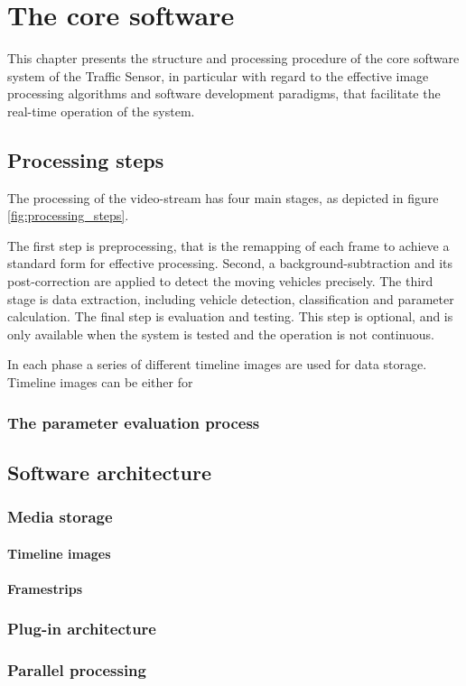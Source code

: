 \chapter{The core software}\label{chap:Core software}
This chapter presents the structure and processing procedure of the core software system of the Traffic Sensor, in particular with regard to the effective image processing algorithms and software development paradigms, that facilitate the real-time operation of the system.
\section{Processing steps}
The processing of the video-stream has four main stages, as depicted in figure \ref{fig:processing_steps}.

The first step is preprocessing, that is the remapping of each frame to achieve a standard form for effective processing.
Second, a background-subtraction and its post-correction are applied to detect the moving vehicles precisely.
The third stage is data extraction, including vehicle detection, classification and parameter calculation.
The final step is evaluation and testing. 
This step is optional, and is only available when the system is tested and the operation is not continuous.

In each phase a series of different timeline images are used for data storage.
Timeline images can be either for 
\subsection{The parameter evaluation process}
\section{Software architecture}
\subsection{Media storage}
\subsubsection{Timeline images}
\subsubsection{Framestrips}

\subsection{Plug-in architecture}
\subsection{Parallel processing}





